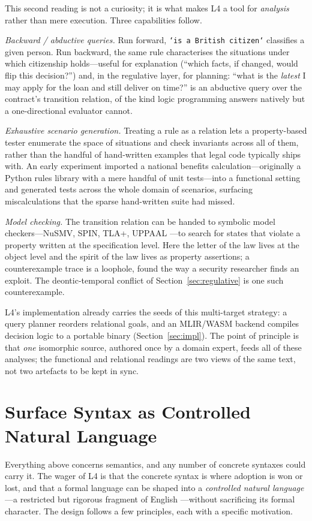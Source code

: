 \documentclass[sigconf,nonacm]{acmart}
\newcommand{\code}[1]{\texttt{\small #1}}
\begin{document}
This second reading is not a curiosity; it is what makes L4 a tool for
\emph{analysis} rather than mere execution. Three capabilities follow.

\emph{Backward / abductive queries.} Run forward, \code{`is a British
citizen`} classifies a given person. Run backward, the same rule
characterises the situations under which citizenship holds---useful for
explanation (``which facts, if changed, would flip this decision?'') and,
in the regulative layer, for planning: ``what is the \emph{latest} I may
apply for the loan and still deliver on time?'' is an abductive query over
the contract's transition relation, of the kind logic programming answers
natively but a one-directional evaluator cannot.

\emph{Exhaustive scenario generation.} Treating a rule as a relation lets a
property-based tester enumerate the space of situations and check
invariants across all of them, rather than the handful of hand-written
examples that legal code typically ships with. An early experiment imported
a national benefits calculation---originally a Python rules library with a
mere handful of unit tests---into a functional setting and generated tests
across the whole domain of scenarios, surfacing miscalculations that the
sparse hand-written suite had missed.

\emph{Model checking.} The transition relation can be handed to symbolic
model checkers---NuSMV, SPIN, TLA+, UPPAAL
\cite{cimatti2002nusmv,holzmann1997spin,lamport2002specifying,behrmann2004uppaal}---to
search for states that violate a property written at the specification
level. Here the letter of the law lives at the object level and the spirit
of the law lives as property assertions; a counterexample trace is a
loophole, found the way a security researcher finds an exploit. The
deontic-temporal conflict of Section~\ref{sec:regulative} is one such
counterexample.

L4's implementation already carries the seeds of this multi-target
strategy: a query planner reorders relational goals, and an MLIR/WASM
backend compiles decision logic to a portable binary
(Section~\ref{sec:impl}). The point of principle is that \emph{one}
isomorphic source, authored once by a domain expert, feeds all of these
analyses; the functional and relational readings are two views of the same
text, not two artefacts to be kept in sync.

\section{Surface Syntax as Controlled Natural Language}\label{sec:cnl}
Everything above concerns semantics, and any number of concrete syntaxes
could carry it. The wager of L4 is that the concrete syntax is where
adoption is won or lost, and that a formal language can be shaped into a
\emph{controlled natural language}---a restricted but rigorous fragment of
English \cite{kuhn2014cnl}---without sacrificing its formal character. The
design follows a few principles, each with a specific motivation.
\end{document}
